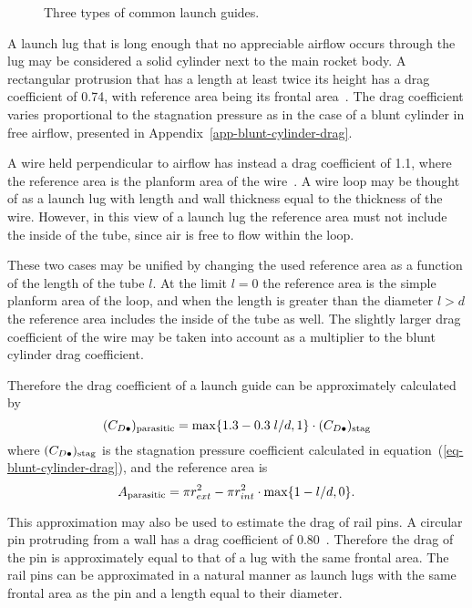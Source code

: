 \begin{figure}
\centering
{}
\caption{Three types of common launch guides.}
\label{fig-launch-guides}
\end{figure}


A launch lug that is long enough that no appreciable airflow occurs
through the lug may be considered a solid cylinder next to the main
rocket body.  A rectangular protrusion that has a length at least
twice its height has a drag coefficient of 0.74, with reference area
being its frontal area~\cite[p.~5-8]{hoerner}.  The drag coefficient
varies proportional to the stagnation pressure as in the case of a
blunt cylinder in free airflow, presented in
Appendix~\ref{app-blunt-cylinder-drag}.

A wire held perpendicular to airflow has instead a drag coefficient of
1.1, where the reference area is the planform area of the
wire~\cite[p.~3-11]{hoerner}.  A wire loop may be thought of as a
launch lug with length and wall thickness equal to the thickness of
the wire.  However, in this view of a launch lug the reference area
must not include the inside of the tube, since air is free to flow
within the loop.

These two cases may be unified by changing the used reference area as
a function of the length of the tube $l$.  At the limit $l=0$ the
reference area is the simple planform area of the loop, and when the
length is greater than the diameter $l>d$ the reference area includes
the inside of the tube as well.  The slightly larger drag coefficient
of the wire may be taken into account as a multiplier to the blunt
cylinder drag coefficient.

Therefore the drag coefficient of a launch guide can be approximately
calculated by
%
\begin{equation}
(C_{D\bullet})_{\rm parasitic} = 
\max\{1.3-0.3\;l/d, 1\} \cdot (C_{D\bullet})_{\rm stag}
\end{equation}
%
where $(C_{D\bullet})_{\rm stag}$ is the stagnation pressure
coefficient calculated in equation~(\ref{eq-blunt-cylinder-drag}), and
the reference area is
%
\begin{equation}
A_{\rm parasitic} = \pi r_{ext}^2 - \pi r_{int}^2 \cdot
\max\{1-l/d,0\}.
\end{equation}

This approximation may also be used to estimate the drag of rail
pins.  A circular pin protruding from a wall has a drag coefficient of
0.80~\cite[p.~5-8]{hoerner}.  Therefore the drag of the pin is
approximately equal to that of a lug with the same frontal area.  The
rail pins can be approximated in a natural manner as launch lugs with
the same frontal area as the pin and a length equal to their
diameter.




